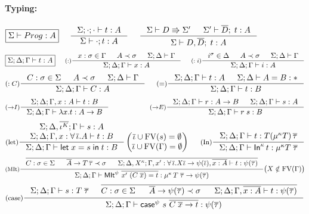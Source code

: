 \begin{figure}
\begin{framed}
\paragraph{Typing:}
\[ \fbox{$\Sigma |- Prog : A$}
 ~~~~
   \inference[]{\Sigma;\cdot;\cdot |- t:A}
               {\Sigma |- \cdot;t : A}
 ~~~~
   \inference[]{ \Sigma |- D \Rrightarrow \Sigma'
               & \Sigma' |- \overline{D};\; t : A}
               {\Sigma |- D,\overline{D};\; t : A}
\]
\[ \fbox{$\Sigma;\Delta;\Gamma |- t : A$}
 ~~~~
   \inference[($:$)]
      {x:\sigma \in \Gamma & A\prec\sigma & \Sigma;\Delta |- \Gamma} 
      {\Sigma;\Delta;\Gamma |- x:A}
 ~~~~
   \inference[($:i$)]
      {i^\sigma \in \Delta & A\prec\sigma & \Sigma;\Delta |- \Gamma} 
      {\Sigma;\Delta;\Gamma |- i:A}
\]
\[ \inference[($:C$)]
      {C:\sigma \in \Sigma & A\prec\sigma & \Sigma;\Delta |- \Gamma}
      {\Sigma;\Delta;\Gamma |- C:A}
 ~~~~
   \inference[($=$)]{\Sigma;\Delta;\Gamma |- t : A & \Sigma;\Delta |- A = B : *}
                    {\Sigma;\Delta;\Gamma |- t : B}
\]
\[ \inference[($->$$I$)]{\Sigma;\Delta;\Gamma,x:A |- t : B}
                        {\Sigma;\Delta;\Gamma |- \lambda x.t : A -> B}
 ~~~~ ~~~~ ~~~~ ~~~~
   \inference[($->$$E$)]{ \Sigma;\Delta;\Gamma |- r : A -> B
                        & \Sigma;\Delta;\Gamma |- s : A}
                        {\Sigma;\Delta;\Gamma |- r\;s : B}
\]
\[ \inference[(let)]
      { \Sigma;\Delta,\overline{\iota^K};\Gamma |- s : A \\
        \Sigma;\Delta;\Gamma,x:\forall\,\overline{\iota}.A |- t : B }
      {\Sigma;\Delta;\Gamma |- \Let{x}{s}{t} : B }
      \begin{pmatrix} \overline{\iota} \cup \FV(s) = \emptyset \\
                      \overline{\iota} \cup \FV(\Gamma) = \emptyset
      \end{pmatrix}
 ~~~~
   \inference[(In)]
      {\Sigma;\Delta;\Gamma |- t : T(\mu^\kappa T)\,\overline{\tau}}
      {\Sigma;\Delta;\Gamma |- \In^\kappa\,t : \mu^\kappa T\; \overline{\tau}}
\]
\[ \inference[(MIt)]
      { \overline{\begin{matrix}
        C:\sigma\in\Sigma ~&~ \overline{A} -> T\,\overline\tau \prec \sigma
      ~&~
        \Sigma;\Delta,X^{\kappa};
        \Gamma
            ,x':\forall\,\overline\iota.X\overline\iota -> \psi(\overline\iota)
            ,\overline{x:A}
          |- t : \psi(\overline\tau) \end{matrix} }
      }
      {\Sigma;\Delta;\Gamma
           |- \MIt^\psi ~ \overline{x' ~ (C\;\overline{x}) = t}
            : \mu^{\kappa}\,T\;\overline\tau -> \psi(\overline\tau) }
      \big( X\notin\FV(\Gamma) \big)
\]
\[ \inference[(case)]
      { \Sigma;\Delta;\Gamma |- s : T\;\overline\tau
      & \overline{\begin{matrix}
          C:\sigma \in \Sigma ~&~
          \overline{A} -> \psi(\overline{\tau}) \prec \sigma ~&~
          \Sigma;\Delta;\Gamma,\overline{x:A} |- t : \psi(\overline\tau) 
        \end{matrix} }
      }
      {\Sigma;\Delta;\Gamma |- \case^\psi~s~\overline{C\;\overline{x} -> t}
                             : \psi(\overline\tau) }
\]


\end{framed}
\end{figure}
